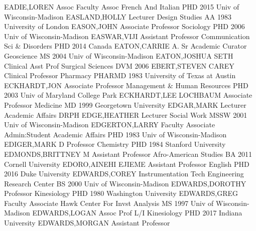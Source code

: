\documentclass[
]{article}
\begin{document}
EADIE,LOREN \textbar Assoc Faculty Assoc \textbar{} 
\textbar French And Italian \textbar PHD 2015 Univ of Wisconsin-Madison
\textbar EASLAND,HOLLY \textbar Lecturer \textbar{} 
\textbar Design Studies \textbar AA 1983 University of London
\textbar EASON,JOHN \textbar Associate Professor \textbar{} 
\textbar Sociology \textbar PHD 2006 Univ of Wisconsin-Madison
\textbar EASWAR,VIJI \textbar Assistant Professor \textbar{} 
\textbar Communication Sci \& Disorders \textbar PHD 2014 Canada
\textbar EATON,CARRIE A. \textbar Sr Academic Curator \textbar{}
 \textbar Geoscience \textbar MS 2004 Univ of
Wisconsin-Madison \textbar EATON,JOSHUA SETH \textbar Clinical Asst Prof
\textbar{}  \textbar Surgical Sciences \textbar DVM 2006
\textbar EBERT,STEVEN CAREY \textbar Clinical Professor \textbar{}
 \textbar Pharmacy \textbar PHARMD 1983 University of Texas
at Austin \textbar ECKHARDT,JON \textbar Associate Professor \textbar{}
 \textbar Management \& Human Resources \textbar PHD 2003
Univ of Maryland College Park \textbar ECKHARDT,LEE LOCHBAUM
\textbar Associate Professor \textbar{}  \textbar Medicine
\textbar MD 1999 Georgetown University \textbar EDGAR,MARK
\textbar Lecturer \textbar{}  \textbar Academic Affairs
\textbar DRPH \textbar EDGE,HEATHER \textbar Lecturer \textbar{}
 \textbar Social Work \textbar MSSW 2001 Univ of
Wisconsin-Madison \textbar EDGERTON,LARRY \textbar Faculty Associate
\textbar{}  \textbar Admin:Student Academic Affairs
\textbar PHD 1983 Univ of Wisconsin-Madison \textbar EDIGER,MARK D
\textbar Professor \textbar{}  \textbar Chemistry
\textbar PHD 1984 Stanford University \textbar EDMONDS,BRITTNEY M
\textbar Assistant Professor \textbar{} 
\textbar Afro-American Studies \textbar BA 2011 Cornell University
\textbar EDORO,AINEHI EJIEME \textbar Assistant Professor \textbar{}
 \textbar English \textbar PHD 2016 Duke University
\textbar EDWARDS,COREY \textbar Instrumentation Tech \textbar{}
 \textbar Engineering Research Center \textbar BS 2000 Univ
of Wisconsin-Madison \textbar EDWARDS,DOROTHY \textbar Professor
\textbar{}  \textbar Kinesiology \textbar PHD 1980 Washington
University \textbar EDWARDS,GREG \textbar Faculty Associate \textbar{}
 \textbar Hawk Center For Invst Analysis \textbar MS 1997
Univ of Wisconsin-Madison \textbar EDWARDS,LOGAN \textbar Assoc Prof L/I
\textbar{}  \textbar Kinesiology \textbar PHD 2017 Indiana
University \textbar EDWARDS,MORGAN \textbar Assistant Professor
\end{document}
